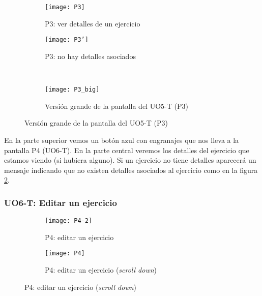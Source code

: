 \begin{figure}[H]
\begin{subfigure}[b]{0.5\textwidth}
	\centering
	\texttt{[image: P3]}
	\caption{P3: ver detalles de un ejercicio}
	\label{fig:diseno-e-implementacion:interfaces:profesor:uo5-t:p3}
\end{subfigure}
%
\begin{subfigure}[b]{0.5\textwidth}
	\centering
	\texttt{[image: P3']}
	\caption{P3: no hay detalles asociados}
	\label{fig:diseno-e-implementacion:interfaces:profesor:uo5-t:p3'}
\end{subfigure}
\\
\begin{subfigure}[b]{\textwidth}
	\centering
	\texttt{[image: P3\_big]}
	\caption{Versión grande de la pantalla del UO5-T (P3)}
	\label{fig:diseno-e-implementacion:interfaces:profesor:uo5-t:p3-big}
\end{subfigure}

\label{fig:diseno-e-implementacion:interfaces:profesor:uo5-t}
\end{figure}

En la parte superior vemos un botón azul con engranajes que nos lleva a la pantalla P4 (UO6-T). En la parte central veremos los detalles del ejercicio que estamos viendo (si hubiera alguno). Si un ejercicio no tiene detalles aparecerá un mensaje indicando que no existen detalles asociados al ejercicio como en la figura \ref{fig:diseno-e-implementacion:interfaces:profesor:uo5-t:p3'}.\\

\subsubsection{UO6-T: Editar un ejercicio}
\label{diseno-e-implementacion:interfaces:profesor:uo6-t}

\begin{figure}[H]
\begin{subfigure}[b]{0.5\textwidth}
	\centering
	\texttt{[image: P4-2]}
	\caption{P4: editar un ejercicio}
	\label{fig:diseno-e-implementacion:interfaces:profesor:uo6-t:p4}
\end{subfigure}
%
\begin{subfigure}[b]{0.5\textwidth}
	\centering
	\texttt{[image: P4]}
	\caption{P4: editar un ejercicio (\textit{scroll down})}
	\label{fig:diseno-e-implementacion:interfaces:profesor:uo6-t:p4'}
\end{subfigure}

\label{fig:diseno-e-implementacion:interfaces:profesor:uo6-t}
\end{figure}


